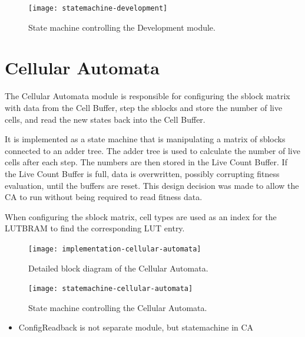 \begin{figure}[!ht]
    \centering
    \texttt{[image: statemachine-development]}
    \caption[Development module state machine]{
        State machine controlling the Development module.
    }
    \label{fig:statemachine-development}
\end{figure}


\section{Cellular Automata}

The Cellular Automata module is responsible for configuring the sblock matrix with data from the Cell Buffer, step the sblocks and store the number of live cells, and read the new states back into the Cell Buffer.

It is implemented as a state machine that is manipulating a matrix of sblocks connected to an adder tree.
The adder tree is used to calculate the number of live cells after each step.
The numbers are then stored in the Live Count Buffer.
If the Live Count Buffer is full, data is overwritten, possibly corrupting fitness evaluation, until the buffers are reset.
This design decision was made to allow the CA to run without being required to read fitness data.

When configuring the sblock matrix, cell types are used as an index for the LUTBRAM to find the corresponding LUT entry.

\begin{figure}[!ht]
    \centering
    \texttt{[image: implementation-cellular-automata]}
    \caption[Cellular Automata]{
        Detailed block diagram of the Cellular Automata.
    }
    \label{fig:implementation-cellular-automata}
\end{figure}

\begin{figure}[!ht]
    \centering
    \texttt{[image: statemachine-cellular-automata]}
    \caption[Cellular Automata state machine]{
        State machine controlling the Cellular Automata.
    }
    \label{fig:statemachine-cellular-automata}
\end{figure}

\begin{itemize}
    \item ConfigReadback is not separate module, but statemachine in CA
\end{itemize}

